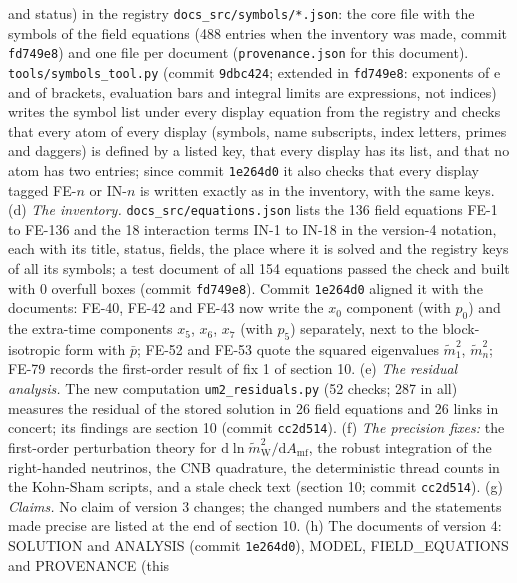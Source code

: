 \documentclass[
  10pt,
]{article}
\begin{document}
\begin{enumerate}
  and status) in the registry \texttt{docs\_src/symbols/*.json}: the
  core file with the symbols of the field equations (488 entries when
  the inventory was made, commit \texttt{fd749e8}) and one file per
  document (\texttt{provenance.json} for this document).
  \texttt{tools/symbols\_tool.py} (commit \texttt{9dbc424}; extended in
  \texttt{fd749e8}: exponents of \(\mathrm{e}\) and of brackets,
  evaluation bars and integral limits are expressions, not indices)
  writes the symbol list under every display equation from the registry
  and checks that every atom of every display (symbols, name subscripts,
  index letters, primes and daggers) is defined by a listed key, that
  every display has its list, and that no atom has two entries; since
  commit \texttt{1e264d0} it also checks that every display tagged
  FE-\(n\) or IN-\(n\) is written exactly as in the inventory, with the
  same keys. (d) \emph{The inventory.} \texttt{docs\_src/equations.json}
  lists the 136 field equations FE-1 to FE-136 and the 18 interaction
  terms IN-1 to IN-18 in the version-4 notation, each with its title,
  status, fields, the place where it is solved and the registry keys of
  all its symbols; a test document of all 154 equations passed the check
  and built with 0 overfull boxes (commit \texttt{fd749e8}). Commit
  \texttt{1e264d0} aligned it with the documents: FE-40, FE-42 and FE-43
  now write the \(x_0\) component (with \(p_0\)) and the extra-time
  components \(x_5\), \(x_6\), \(x_7\) (with \(p_5\)) separately, next
  to the block-isotropic form with \(\bar p\); FE-52 and FE-53 quote the
  squared eigenvalues \(\tilde m_1^2\), \(\tilde m_n^2\); FE-79 records
  the first-order result of fix 1 of section 10. (e) \emph{The residual
  analysis.} The new computation \texttt{um2\_residuals.py} (52 checks;
  287 in all) measures the residual of the stored solution in 26 field
  equations and 26 links in concert; its findings are section 10 (commit
  \texttt{cc2d514}). (f) \emph{The precision fixes:} the first-order
  perturbation theory for
  \(\mathrm{d}\ln\tilde m_{\mathrm{W}}^2/\mathrm{d}A_{\mathrm{mf}}\),
  the robust integration of the right-handed neutrinos, the CNB
  quadrature, the deterministic thread counts in the Kohn-Sham scripts,
  and a stale check text (section 10; commit \texttt{cc2d514}). (g)
  \emph{Claims.} No claim of version 3 changes; the changed numbers and
  the statements made precise are listed at the end of section 10. (h)
  The documents of version 4: SOLUTION and ANALYSIS (commit
  \texttt{1e264d0}), MODEL, FIELD\_EQUATIONS and PROVENANCE (this

\end{enumerate}
\end{document}
